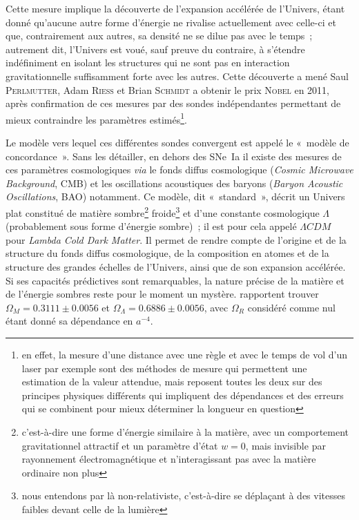\documentclass[../main/main.tex]{subfiles}
\begin{document}
Cette mesure implique la découverte de l'expansion accélérée de l'Univers, étant
donné qu'aucune autre forme d'énergie ne rivalise actuellement avec celle-ci et
que, contrairement aux autres, sa densité ne se dilue pas avec le temps~;
autrement dit, l'Univers est voué, sauf preuve du contraire, à s'étendre
indéfiniment en isolant les structures qui ne sont pas en interaction
gravitationnelle suffisamment forte avec les autres. Cette découverte a mené
Saul \textsc{Perlmutter}, Adam \textsc{Riess} et Brian \textsc{Schmidt} a
obtenir le prix \textsc{Nobel} en 2011, après confirmation de ces mesures par
des sondes indépendantes permettant de mieux contraindre les paramètres
estimés\footnote{en effet, la mesure d'une distance avec une règle et avec le
    temps de vol d'un laser par exemple sont des méthodes de mesure qui
    permettent une estimation de la valeur attendue, mais reposent toutes les
    deux sur des principes physiques différents qui impliquent des dépendances
    et des erreurs qui se combinent pour mieux déterminer la longueur en
question}.

Le modèle vers lequel ces différentes sondes convergent est appelé le «~modèle
de concordance~». Sans les détailler, en dehors des SNe~Ia il existe des mesures
de ces paramètres cosmologiques \textit{via} le fonds diffus cosmologique
(\textit{Cosmic Microwave Background}, CMB) et les oscillations acoustiques des
baryons (\textit{Baryon Acoustic Oscillations}, BAO) notamment. Ce modèle, dit
«~standard~», décrit un Univers plat constitué de matière
sombre\footnote{c'est-à-dire une forme d'énergie similaire à la matière, avec un
    comportement gravitationnel attractif et un paramètre d'état $w=0$, mais
    invisible par rayonnement électromagnétique et n'interagissant pas avec la
matière ordinaire non plus} froide\footnote{nous entendons par là
    non-relativiste, c'est-à-dire se déplaçant à des vitesses faibles devant
celle de la lumière} et d'une constante cosmologique $\Lambda$ (probablement
sous forme d'énergie sombre)~; il est pour cela appelé $\Lambda CDM$ pour
\textit{Lambda Cold Dark Matter}. Il permet de rendre compte de l'origine et
de la structure du fonds diffus cosmologique, de la composition en atomes et
de la structure des grandes échelles de l'Univers, ainsi que de son
expansion accélérée. Si ses capacités prédictives sont remarquables, la
nature précise de la matière et de l'énergie sombres reste pour le moment un
mystère. \cite{planck2018} rapportent trouver $\Omega_M = \num{0.3111} \pm
\num{0.0056}$ et $\Omega_\Lambda = \num{0.6886} \pm \num{0.0056}$, avec
$\Omega_R$ considéré comme nul étant donné sa dépendance en $a^{-4}$.
\end{document}
